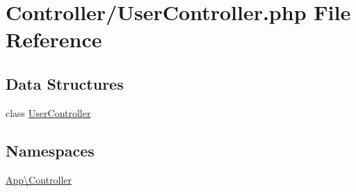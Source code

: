 \hypertarget{_user_controller_8php}{}\section{Controller/\+User\+Controller.php File Reference}
\label{_user_controller_8php}
\subsection*{Data Structures}
\begin{DoxyCompactItemize}
\item 
class \mbox{\hyperlink{class_app_1_1_controller_1_1_user_controller}{User\+Controller}}
\end{DoxyCompactItemize}
\subsection*{Namespaces}
\begin{DoxyCompactItemize}
\item 
 \mbox{\hyperlink{namespace_app_1_1_controller}{App\textbackslash{}\+Controller}}
\end{DoxyCompactItemize}
